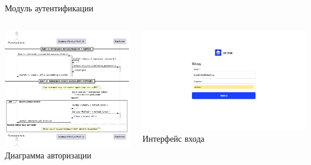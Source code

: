 \documentclass[aspectratio=169]{beamer}
\begin{document}
\begin{frame}{Модуль аутентификации}
\small

\begin{columns}
    \begin{column}{0.5\textwidth}
        \centering
        \includegraphics[width=0.95\linewidth]{static/AuthRefresh.png} \\
        \small Диаграмма авторизации
    \end{column}
    \begin{column}{0.5\textwidth}
        \centering
        \includegraphics[width=0.95\linewidth]{static/LoginPage.png} \\
        \small Интерфейс входа
    \end{column}
\end{columns}
\end{frame}
\end{document}
